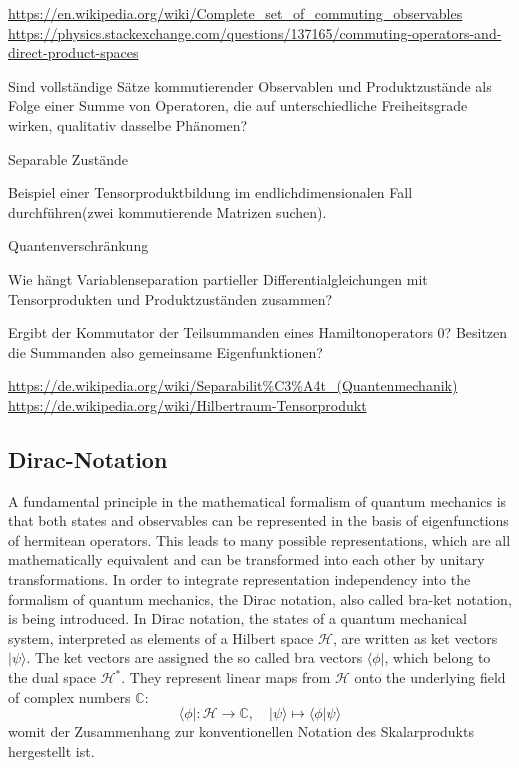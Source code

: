 \documentclass[9pt]{report}
\begin{document}
\url{https://en.wikipedia.org/wiki/Complete_set_of_commuting_observables}\\
\url{https://physics.stackexchange.com/questions/137165/commuting-operators-and-direct-product-spaces}




Sind vollständige Sätze kommutierender Observablen und Produktzustände als Folge einer Summe von Operatoren, die auf unterschiedliche Freiheitsgrade wirken, qualitativ dasselbe Phänomen?

Separable Zustände

Beispiel einer Tensorproduktbildung im endlichdimensionalen Fall durchführen(zwei kommutierende Matrizen suchen).

Quantenverschränkung

Wie hängt Variablenseparation partieller Differentialgleichungen mit Tensorprodukten und Produktzuständen zusammen?

Ergibt der Kommutator der Teilsummanden eines Hamiltonoperators 0? Besitzen die Summanden also gemeinsame Eigenfunktionen?

\url{https://de.wikipedia.org/wiki/Separabilit%C3%A4t_(Quantenmechanik)}\\
\url{https://de.wikipedia.org/wiki/Hilbertraum-Tensorprodukt}






\subsection{Dirac-Notation}
A fundamental principle in the mathematical formalism of quantum mechanics is that both states and observables can be represented in the basis of eigenfunctions of hermitean operators. This leads to many possible representations, which are all mathematically equivalent and can be transformed into each other by unitary transformations. In order to integrate representation independency into the formalism of quantum mechanics, the Dirac notation, also called bra-ket notation, is being introduced. In Dirac notation, the states of a quantum mechanical system, interpreted as elements of a Hilbert space $\mathcal{H}$, are written as ket vectors $|\psi\rangle$. The ket vectors are assigned the so called bra vectors $\langle\phi|$, which belong to the dual space $\mathcal{H}^{*}$. They represent linear maps from $\mathcal{H}$ onto the underlying field of complex numbers $\mathbb{C}$:
\begin{equation}
\langle\phi|:\mathcal{H}\to\mathbb{C},\quad|\psi\rangle\mapsto\langle\phi|\psi\rangle
\end{equation}
womit der Zusammenhang zur konventionellen Notation des Skalarprodukts hergestellt ist.
\end{document}
